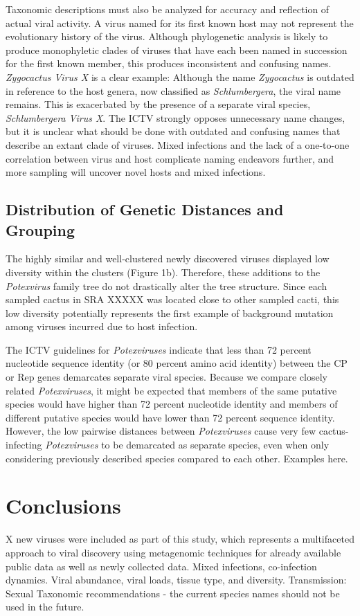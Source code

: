 \documentclass[fleqn,10pt,lineno]{wlpeerj}
\begin{document}
Taxonomic descriptions must also be analyzed for accuracy and reflection of actual viral activity. 
A virus named for its first known host may not represent the evolutionary history of the virus.
Although phylogenetic analysis is likely to produce monophyletic clades of viruses that have each been named in succession for the first known member, this produces inconsistent and confusing names.
\textit{Zygocactus Virus X} is a clear example: Although the name \textit{Zygocactus} is outdated in reference to the host genera, now classified as \textit{Schlumbergera}, the viral name remains.
This is exacerbated by the presence of a separate viral species, \textit{Schlumbergera Virus X}.
The ICTV strongly opposes unnecessary name changes, but it is unclear what should be done with outdated and confusing names that describe an extant clade of viruses.
Mixed infections and the lack of a one-to-one correlation between virus and host complicate naming endeavors further, and more sampling will uncover novel hosts and mixed infections.

\subsection*{Distribution of Genetic Distances and Grouping}
The highly similar and well-clustered newly discovered viruses displayed low diversity within the clusters (Figure 1b).
Therefore, these additions to the \textit{Potexvirus} family tree do not drastically alter the tree structure.
Since each sampled cactus in SRA XXXXX was located close to other sampled cacti, this low diversity potentially represents the first example of background mutation among viruses incurred due to host infection.


The ICTV guidelines for \textit{Potexviruses} indicate that less than 72 percent nucleotide sequence identity (or 80 percent amino acid identity) between the CP or Rep genes demarcates separate viral species. %
Because we compare closely related \textit{Potexviruses}, it might be expected that members of the same putative species would have higher than 72 percent nucleotide identity and members of different putative species would have lower than 72 percent sequence identity.
However, the low pairwise distances between \textit{Potexviruses} cause very few cactus-infecting \textit{Potexviruses} to be demarcated as separate species, even when only considering previously described species compared to each other.
Examples here.

\section*{Conclusions}
X new viruses were included as part of this study, which represents a multifaceted approach to viral discovery using metagenomic techniques for already available public data as well as newly collected data.
Mixed infections, co-infection dynamics.
Viral abundance, viral loads, tissue type, and diversity.
Transmission: Sexual
Taxonomic recommendations - the current species names should not be used in the future.
\end{document}
